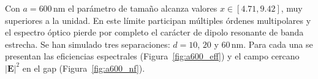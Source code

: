 


Con $a=600\,\text{nm}$ el parámetro de tamaño alcanza valores
$x\in[4.71,9.42]$, muy superiores a la unidad. En este límite participan
múltiples órdenes multipolares y el espectro óptico pierde por completo el
carácter de dipolo resonante de banda estrecha. Se han simulado tres
separaciones: $d=10$, $20$ y $60\,\text{nm}$. Para cada una se presentan las
eficiencias espectrales (Figura~\ref{fig:a600_eff}) y el campo cercano
$|\mathbf{E}|^2$ en el gap (Figura~\ref{fig:a600_nf}).

